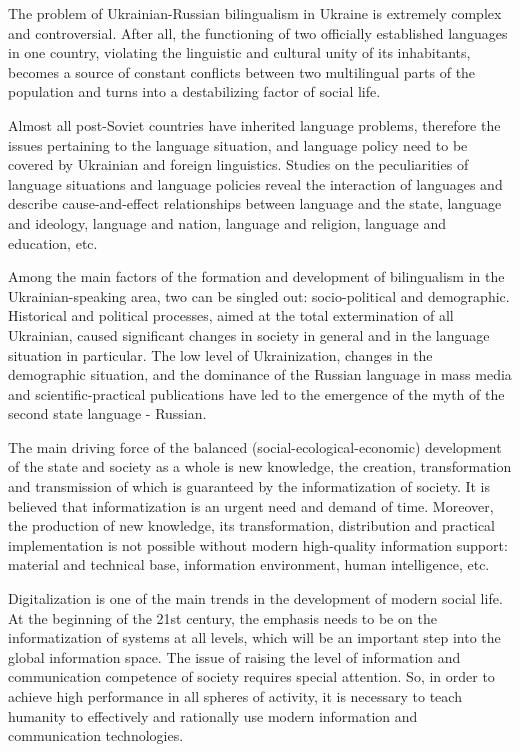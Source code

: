\documentclass[english]{textolivre}
\begin{document}
The problem of Ukrainian-Russian bilingualism in Ukraine is extremely complex and controversial. After all, the functioning of two officially established languages in one country, violating the linguistic and cultural unity of its inhabitants, becomes a source of constant conflicts between two multilingual parts of the population and turns into a destabilizing factor of social life.

Almost all post-Soviet countries have inherited language problems, therefore the issues pertaining to the language situation, and language policy need to be covered by Ukrainian and foreign linguistics. Studies on the peculiarities of language situations and language policies reveal the interaction of languages and describe cause-and-effect relationships between language and the state, language and ideology, language and nation, language and religion, language and education, etc.

Among the main factors of the formation and development of bilingualism in the Ukrainian-speaking area, two can be singled out: socio-political and demographic. Historical and political processes, aimed at the total extermination of all Ukrainian, caused significant changes in society in general and in the language situation in particular. The low level of Ukrainization, changes in the demographic situation, and the dominance of the Russian language in mass media and scientific-practical publications have led to the emergence of the myth of the second state language - Russian.

The main driving force of the balanced (social-ecological-economic) development of the state and society as a whole is new knowledge, the creation, transformation and transmission of which is guaranteed by the informatization of society. It is believed that informatization is an urgent need and demand of time. Moreover, the production of new knowledge, its transformation, distribution and practical implementation is not possible without modern high-quality information support: material and technical base, information environment, human intelligence, etc.

Digitalization is one of the main trends in the development of modern social life. At the beginning of the 21st century, the emphasis needs to be on the informatization of systems at all levels, which will be an important step into the global information space. The issue of raising the level of information and communication competence of society requires special attention. So, in order to achieve high performance in all spheres of activity, it is necessary to teach humanity to effectively and rationally use modern information and communication technologies.
\end{document}
